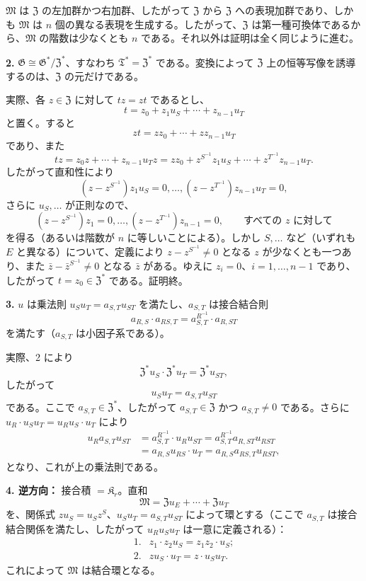 \(\mathfrak M\) は \(\mathfrak Z\) の左加群かつ右加群、したがって \(\mathfrak Z\) から \(\mathfrak Z\) への表現加群であり、しかも \(\mathfrak M\) は \(n\) 個の異なる表現を生成する。したがって、\(\mathfrak Z\) は第一種可換体であるから、\(\mathfrak M\) の階数は少なくとも \(n\) である。それ以外は証明は全く同じように進む。

\noindent\textbf{2.} \(\mathfrak G\cong\mathfrak G^*/\mathfrak Z^*\)、すなわち \(\mathfrak T^*=\mathfrak Z^*\) である。変換によって \(\mathfrak Z\) 上の恒等写像を誘導するのは、\(\mathfrak Z\) の元だけである。

実際、各 \(z\in\mathfrak Z\) に対して \(tz=zt\) であるとし、
\[
t=z_0+z_1u_S+\cdots+z_{n-1}u_T
\]
と置く。すると
\[
zt=zz_0+\cdots+zz_{n-1}u_T
\]
であり、また
\[
tz=z_0z+\cdots+z_{n-1}u_Tz
=zz_0+z^{S^{-1}}z_1u_S+\cdots+z^{T^{-1}}z_{n-1}u_T.
\]
したがって直和性により
\[
(z-z^{S^{-1}})z_1u_S=0,\ldots,
(z-z^{T^{-1}})z_{n-1}u_T=0,
\]
さらに \(u_S,\ldots\) が正則なので、
\[
(z-z^{S^{-1}})z_1=0,\ldots,
(z-z^{T^{-1}})z_{n-1}=0,
\qquad\text{すべての }z\text{ に対して}
\]
を得る（あるいは階数が \(n\) に等しいことによる）。しかし \(S,\ldots\) など（いずれも \(E\) と異なる）について、定義により \(z-z^{S^{-1}}\ne0\) となる \(z\) が少なくとも一つあり、また \(\bar z-\bar z^{S^{-1}}\ne0\) となる \(\bar z\) がある。ゆえに \(z_i=0\)、\(i=1,\ldots,n-1\) であり、したがって \(t=z_0\in\mathfrak Z^*\) である。証明終。

\noindent\textbf{3.} \(u\) は乗法則 \(u_Su_T=a_{S,T}u_{ST}\) を満たし、\(a_{S,T}\) は接合結合則
\[
a_{R,S}\cdot a_{RS,T}=a_{S,T}^{R^{-1}}\cdot a_{R,ST}
\]
を満たす（\(a_{S,T}\) は小因子系である）。

実際、2 により
\[
\mathfrak Z^*u_S\cdot\mathfrak Z^*u_T=\mathfrak Z^*u_{ST},
\]
したがって
\[
u_Su_T=a_{S,T}u_{ST}
\]
である。ここで \(a_{S,T}\in\mathfrak Z^*\)、したがって \(a_{S,T}\in\mathfrak Z\) かつ \(a_{S,T}\ne0\) である。さらに \(u_R\cdot u_Su_T=u_Ru_S\cdot u_T\) により
\[
\begin{aligned}
u_Ra_{S,T}u_{ST}
&=a_{S,T}^{R^{-1}}\cdot u_Ru_{ST}
=a_{S,T}^{R^{-1}}a_{R,ST}u_{RST}\\
&=a_{R,S}u_{RS}\cdot u_T
=a_{R,S}a_{RS,T}u_{RST},
\end{aligned}
\]
となり、これが上の乗法則である。

\noindent\textbf{4. 逆方向：} 接合積 \(=\mathfrak K_r\)。直和
\[
\mathfrak M=\mathfrak Zu_E+\cdots+\mathfrak Zu_T
\]
を、関係式 \(zu_S=u_Sz^S\)、\(u_Su_T=a_{S,T}u_{ST}\) によって環とする（ここで \(a_{S,T}\) は接合結合関係を満たし、したがって \(u_Ru_Su_T\) は一意に定義される）：
\[
\begin{array}{ll}
1.&z_1\cdot z_2u_S=z_1z_2\cdot u_S;\\[2pt]
2.&zu_S\cdot u_T=z\cdot u_Su_T.
\end{array}
\]
これによって \(\mathfrak M\) は結合環となる。

